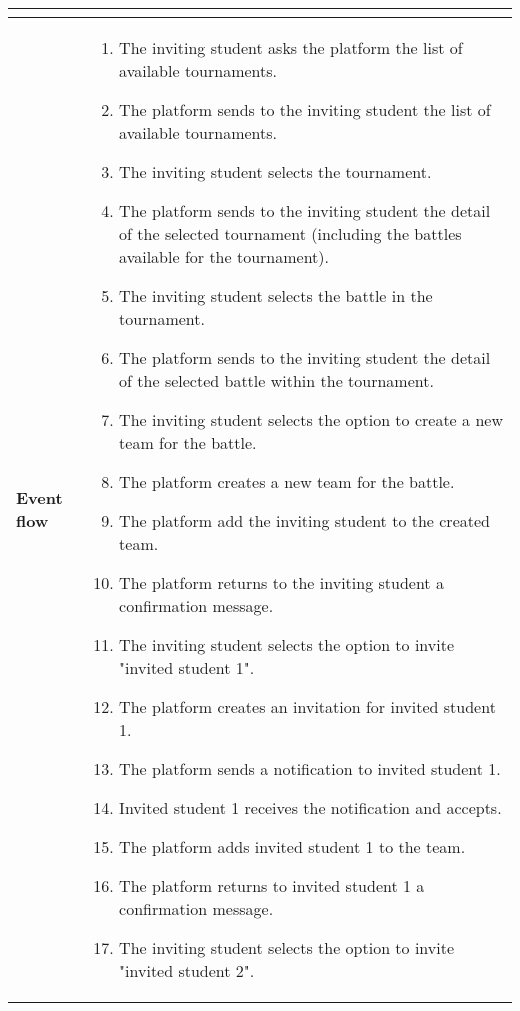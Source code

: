 \begin{enumerate}[label=\textbf{UC\arabic*}:,ref=UC\arabic*,leftmargin=1.3cm]
{\begin{longtable}{|l|p{11.9cm}|}
\begin{itemize}
                  \end{itemize}                                                                                                   \\\hline
                  \textbf{Event flow}      &
                  \begin{enumerate}[label=\arabic*.]
                        \item The inviting student asks the platform the list of available tournaments.
                        \item The platform sends to the inviting student the list of available tournaments.
                        \item The inviting student selects the tournament.
                        \item The platform sends to the inviting student the detail of the selected tournament (including the battles available for the tournament).
                        \item The inviting student selects the battle in the tournament.
                        \item The platform sends to the inviting student the detail of the selected battle within the tournament.
                        \item The inviting student selects the option to create a new team for the battle.
                        \item The platform creates a new team for the battle.
                        \item The platform add the inviting student to the created team.
                        \item The platform returns to the inviting student a confirmation message.
                        \item The inviting student selects the option to invite "invited student 1".
                        \item The platform creates an invitation for invited student 1.
                        \item The platform sends a notification to invited student 1.
                        \item Invited student 1 receives the notification and accepts.
                        \item The platform adds invited student 1 to the team.
                        \item The platform returns to invited student 1 a confirmation message.
                        \item The inviting student selects the option to invite "invited student 2".

\end{enumerate}
\end{longtable}}
\end{enumerate}
